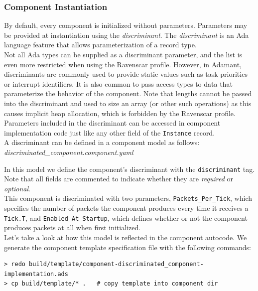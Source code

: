 \subsubsection{Component Instantiation} \label{Component Instantiation}

By default, every component is initialized without parameters. Parameters may be provided at instantiation using the \textit{discriminant}. The \textit{discriminant} is an Ada language feature that allows parameterization of a record type. \\

Not all Ada types can be supplied as a discriminant parameter, and the list is even more restricted when using the Ravenscar profile. However, in Adamant, discriminants are commonly used to provide static values such as task priorities or interrupt identifiers. It is also common to pass access types to data that parameterize the behavior of the component. Note that lengths cannot be passed into the discriminant and used to size an array (or other such operations) as this causes implicit heap allocation, which is forbidden by the Ravenscar profile. Parameters included in the discriminant can be accessed in component implementation code just like any other field of the \texttt{Instance} record. \\ 

A discriminant can be defined in a component model as follows: \\

\textit{discriminated\_component.component.yaml}

In this model we define the component's discriminant with the \texttt{discriminant} tag. Note that all fields are commented to indicate whether they are \textit{required} or \textit{optional}. \\

This component is discriminated with two parameters, \texttt{Packets\_Per\_Tick}, which specifies the number of packets the component produces every time it receives a \texttt{Tick.T}, and \texttt{Enabled\_At\_Startup}, which defines whether or not the component produces packets at all when first initialized. \\

Let's take a look at how this model is reflected in the component autocode. We generate the component template specification file with the following commands:

\vspace{5mm} %
\begin{verbatim}
> redo build/template/component-discriminated_component-implementation.ads
> cp build/template/* .   # copy template into component dir
\end{verbatim}
\vspace{5mm} %

